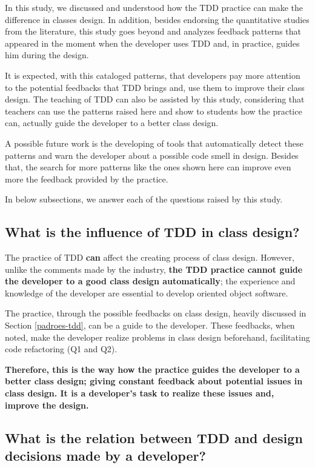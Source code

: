 \documentclass[times]{speauth}
\begin{document}
In this study, we discussed and understood how the TDD practice can make the
difference in classes design.
In addition, besides endorsing the quantitative studies from the literature, this study
goes beyond and analyzes feedback patterns that appeared in the moment when
the developer uses TDD and, in practice, guides him during the design.

It is expected, with this cataloged patterns, that developers pay more attention
to the potential feedbacks that TDD brings and, use them to improve their class
design. The teaching of TDD can also be assisted by this study, considering
that teachers can use the patterns raised here and show to students
how the practice can, actually guide the developer to a better class design.


A possible future work is the developing of tools that automatically detect these patterns
and warn the developer about a possible code smell in design. Besides that,
the search for more patterns like the ones shown here can improve even more the feedback
provided by the practice.

In below subsections, we answer each of the questions raised by this study.

\subsection{What is the influence of TDD in class design?}

The practice of TDD \textbf{can} affect the creating process of class design. However,
unlike the comments made by the industry, \textbf{the TDD practice cannot guide the
developer to a good class design automatically}; the experience and knowledge of
the developer are essential to develop oriented object software.

The practice, through the possible feedbacks on class design, heavily
discussed in Section \ref{padroes-tdd}, can be a guide to the developer.
These feedbacks, when noted, make the developer realize problems in class
design beforehand, facilitating code refactoring (Q1 and Q2).

\textbf{Therefore, this is the way how the practice guides the developer to
a better class design; giving constant feedback about potential issues in
class design. It is a developer's task to realize these issues and, 
improve the design. }

\subsection{What is the relation between TDD and design decisions made by
a developer?}
\end{document}
